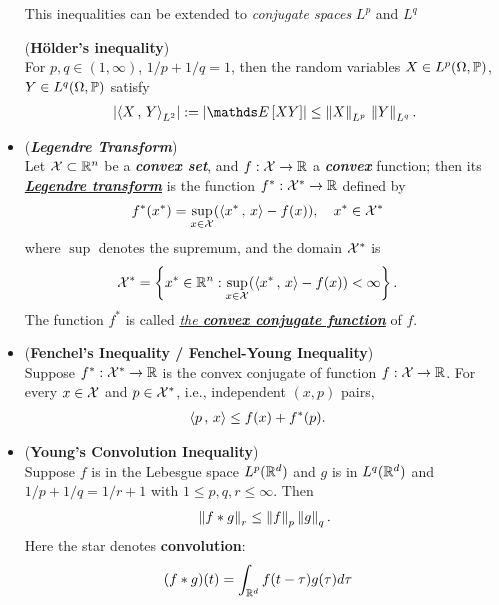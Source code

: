 \documentclass[11pt]{article}
\begin{document}
\begin{itemize}
This inequalities can be extended to \emph{conjugate spaces} $L^p$ and $L^q$ 
 \begin{proposition} (\textbf{H\"older's inequality}) \citep{vershynin2018high}\\
For $p,q \in (1, \infty)$, $1/p + 1/q = 1$, then the random variables $X \in L^p(\Omega, {\mathbb P})$, $Y \in L^q(\Omega, {\mathbb P})$ satisfy
\begin{align}
\abs{\inn{X}{Y}_{L^2}} := \abs{\E{}{XY}}  \le \norm{X}{L^p} \, \norm{Y}{L^q}. \label{ineqn: holder_inequality}
\end{align}
\end{proposition}

\item \begin{definition}(\textbf{\emph{Legendre Transform}}) \\
Let ${\mathcal X} \subset {\mathbb R}^n$ be a \emph{\textbf{convex set}}, and $f: {\mathcal X} \to {\mathbb R}$ a \textbf{\emph{convex}} function; then its \underline{\emph{\textbf{Legendre transform}}} is the function  $f^{*}: {\mathcal X}^{*}\to {\mathbb R}$ defined by
\begin{align*}
f^{*}(x^{*}) &= \sup _{x\in {\mathcal X}}(\left\langle x^{*}\,,\, x \right\rangle - f(x)), \quad x^{*}\in {\mathcal X}^{*}
\end{align*}
where $\sup$ denotes the supremum, and the domain ${\mathcal X}^{*}$  is
\begin{align*}
{\mathcal X}^{*} &= \left\{x^{*}\in {\mathbb R}^n: \sup _{x\in {\mathcal X}}(\left\langle x^{*}\,,\, x \right\rangle-f(x))<\infty \right\}.
\end{align*} The function $f^{*}$ is called \underline{\emph{the \textbf{convex conjugate function}}} of $f$.
\end{definition}

\item \begin{theorem} (\textbf{Fenchel's Inequality / Fenchel-Young Inequality})\\
Suppose $f^{*}: {\mathcal X}^{*} \to {\mathbb R}$ is the  convex conjugate of function $f: {\mathcal X} \to {\mathbb R}$. For every $x \in {\mathcal X}$ and $p \in {\mathcal X}^{*}$, i.e., independent $(x, p)$ pairs,
\begin{align}
\left\langle p\,,\, x \right\rangle &\le f(x) + f^{*}(p). \label{ineqn: fenchel_inequality}
\end{align}
\end{theorem}

\item \begin{theorem} (\textbf{Young's Convolution Inequality})\\
Suppose  $f$ is in the Lebesgue space $L^{p}({\mathbb R}^{d})$ and $g$ is in $L^{q}({\mathbb R}^{d})$ and $1/p + 1/q = 1/r + 1$ with $ 1 \leq p,q,r \leq \infty$. Then
\begin{align}
\left\|f * g\right\|_{r} \le \left\|f\right\|_{p} \left\|g\right\|_{q}. \label{ineqn: fenchel_convolution_inequality}
\end{align}
Here the star denotes \textbf{convolution}:
\begin{align*}
(f*g)(t) &= \int_{{\mathbb R}^{d}} f(t - \tau)g(\tau) d\tau
\end{align*}
\end{theorem}
\end{itemize}
\end{document}
